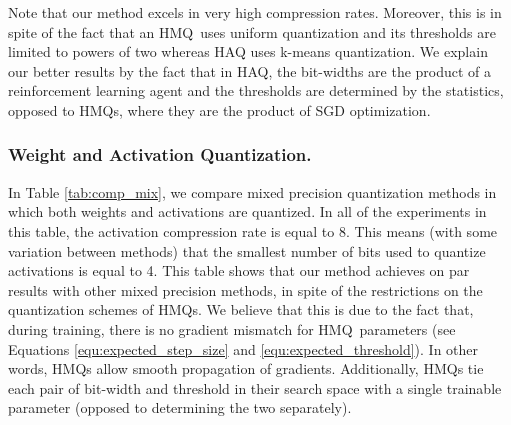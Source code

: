 \documentclass{article}
\newcommand{\qb}{HMQ}
\begin{document}
Note that our method excels in very high compression rates.
Moreover, this is in spite of the fact that an \qb\ uses uniform quantization and its thresholds are limited to powers of two whereas HAQ uses k-means quantization.
We explain our better results by the fact that in HAQ, the bit-widths are the product of a reinforcement learning agent and the thresholds are determined by the statistics, opposed to \qb s, where they are the product of SGD optimization.



\subsubsection{Weight and Activation Quantization.}
In Table \ref{tab:comp_mix}, we compare mixed precision quantization methods in which both weights and activations are quantized. 
In all of the experiments in this table, the activation compression rate is equal to 8.
This means (with some variation between methods) that the smallest number of bits used to quantize activations is equal to 4.
This table shows that our method achieves on par results with other mixed precision methods, in spite of the restrictions on the quantization schemes of \qb s. 
We believe that this is due to the fact that, during training, there is no gradient mismatch for \qb\ parameters (see Equations \ref{equ:expected_step_size} and \ref{equ:expected_threshold}). 
In other words, \qb s allow smooth propagation of gradients. 
Additionally, \qb s tie each pair of bit-width and threshold in their search space with a single trainable parameter (opposed to determining the two separately).
\end{document}
